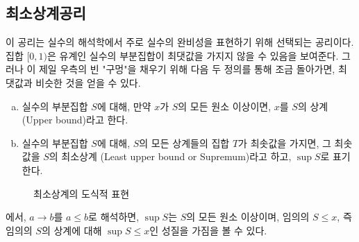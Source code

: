 \subsection{최소상계공리}

이 공리는 실수의 해석학에서 주로 실수의 완비성을 표현하기 위해 선택되는 공리이다.
집합 $[0, 1)$은 유계인 실수의 부분집합이 최댓값을 가지지 않을 수 있음을 보여준다.
그러나 이 제일 우측의 빈 "구멍"을 채우기 위해 다음 두 정의를 통해 조금 돌아가면, 최댓값과 비슷한 것을 얻을 수 있다.
\begin{definition}
\label{def:leastup}
    \begin{enumerate}[(a)]
        \item 실수의 부분집합 $S$에 대해, 만약 $x$가 $S$의 모든 원소 이상이면, $x$를 $S$의 상계 (Upper bound)라고 한다.  
        \item 실수의 부분집합 $S$에 대해, $S$의 모든 상계들의 집합 $T$가 최솟값을 가지면, 그 최솟값을 $S$의 최소상계 (Least upper bound or Supremum)라고 하고, $\sup S$로 표기한다.   
    \end{enumerate}
\end{definition}
\begin{figure}[ht]
    \centering
    \caption{최소상계의 도식적 표현}
    \label{fig:lubfigure}
\end{figure}
에서, $a \to b$를 $a \leq b$로 해석하면, $\sup S$는 $S$의 모든 원소 이상이며, 임의의 $S \leq x$, 즉 임의의 $S$의 상계에 대해 $\sup S \leq x$인 성질을 가짐을 볼 수 있다.

